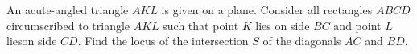An acute-angled triangle $AKL$ is given on a plane. Consider all rectangles $ABCD$ circumscribed to triangle $AKL$ such that point $K$ lies on side $BC$ and point $L$ lieson side $CD$. Find the locus of the intersection $S$ of the diagonals $AC$ and $BD$.